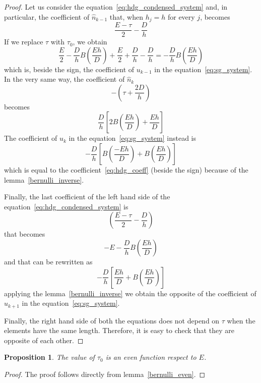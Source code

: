 \documentclass[a4paper,11pt, draft]{article}
\newtheorem{prop}{Proposition}
\begin{document}
\begin{proof}
 Let us consider the equation~\ref{eq:hdg_condensed_system} and, in particular, the coefficient of 
$\widehat{n}_{k-1}$ that, when $h_j = h$ for every $j$, becomes
\[ \frac{E \! - \! \tau}{2} - \frac{D}{h} \]
If we replace $\tau$ with $\tau_0$, we obtain
\[ \frac{E}{2} - \frac{D}{h} B\left(\! \frac{Eh}{D}\!\right) + \frac{E}{2} + \frac{D}{h} - 
\frac{D}{h} = - \frac{D}{h} B\left(\! \frac{Eh}{D}\!\right) \]
which is, beside the sign, the coefficient of $u_{k-1}$ in the equation~\ref{eq:sg_system}.
In the very same way, the coefficient of $\widehat{n}_k$
\[ - \left( \tau + \frac{2D}{h} \right)\]
becomes
\begin{equation}\label{eq:hdg_coeff} \frac{D}{h}\left[2B\left(\!\frac{Eh}{D}\!\right) + 
\frac{Eh}{D} \right] \end{equation}
The coefficient of $u_k$ in the equation~\ref{eq:sg_system} instead is
\[ - \frac{D}{h}\left[B\left(\!\frac{-Eh}{D} \!\right) + B\left(\!\frac{Eh}{D} \!\right) \right]\]
which is equal to the coefficient~\ref{eq:hdg_coeff} (beside the sign) because of the 
lemma~\ref{bernulli_inverse}.

Finally, the last coefficient of the left hand side of the equation~\ref{eq:hdg_condensed_system} is
\[ \left(\frac{E - \tau}{2} - \frac{D}{h} \right)\]
that becomes
\[  -E - \frac{D}{h}B\left(\! \frac{Eh}{D}\!\right)\]
and that can be rewritten as
\[ - \frac{D}{h} \left[ \frac{Eh}{D} + B\left(\! \frac{Eh}{D} \! \right)\right]\]
applying the lemma~\ref{bernulli_inverse} we obtain the opposite of the coefficient of $u_{k + 1}$ 
in the equation~\ref{eq:sg_system}.

Finally, the right hand side of both the equations does not depend on $\tau$ when the elements have 
the same length. Therefore, it is easy to check that they are opposite of each other.
\end{proof}

\begin{prop}
The value of $\tau_0$ is an even function respect to $E$.
\end{prop}
\begin{proof}
 The proof follows directly from lemma~\ref{bernulli_even}.
\end{proof}
\end{document}
